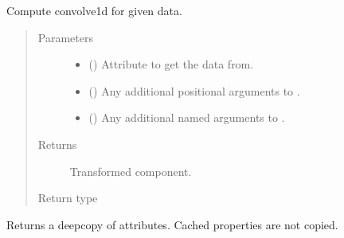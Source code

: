 \documentclass[letterpaper,10pt,english]{sphinxmanual}
\begin{document}
\begin{fulllineitems}
\begin{fulllineitems}
\label{\detokenize{api/states:geology.src.States.convolve1d}}
Compute convolve1d for given data.
\begin{quote}\begin{description}
\item[{Parameters}] \leavevmode\begin{itemize}
\item {} 
 (\sphinxstyleliteralemphasis{\sphinxupquote{, }}) \textendash{} Attribute to get the data from.

\item {} 
 () \textendash{} Any additional positional arguments to .

\item {} 
 () \textendash{} Any additional named arguments to .

\end{itemize}

\item[{Returns}] \leavevmode
{} \textendash{} Transformed component.

\item[{Return type}] \leavevmode
{\hyperref[\detokenize{api/base_classes:geology.src.base_spatial.SpatialComponent}]{}}

\end{description}\end{quote}

\end{fulllineitems}


\begin{fulllineitems}
\label{\detokenize{api/states:geology.src.States.copy}}
Returns a deepcopy of attributes. Cached properties are not copied.


\end{fulllineitems}
\end{fulllineitems}
\end{document}

